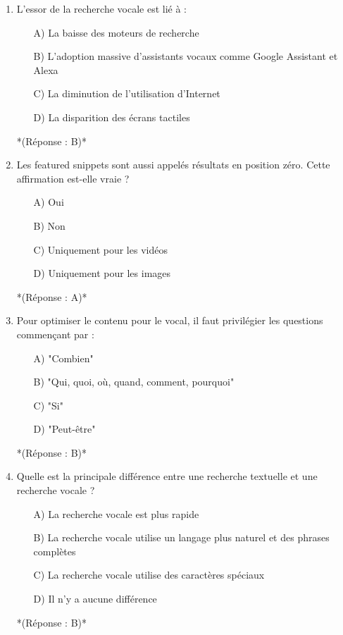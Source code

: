 \documentclass[12pt,a4paper,twoside]{report}
\begin{document}
\begin{enumerate}
    \item L'essor de la recherche vocale est lié à :
    \begin{itemize}
        \item[A)] La baisse des moteurs de recherche
        \item[B)] L'adoption massive d'assistants vocaux comme Google Assistant et Alexa
        \item[C)] La diminution de l'utilisation d'Internet
        \item[D)] La disparition des écrans tactiles
    \end{itemize}
    *(Réponse : B)*

    \item Les featured snippets sont aussi appelés résultats en position zéro. Cette affirmation est-elle vraie ?
    \begin{itemize}
        \item[A)] Oui
        \item[B)] Non
        \item[C)] Uniquement pour les vidéos
        \item[D)] Uniquement pour les images
    \end{itemize}
    *(Réponse : A)*

    \item Pour optimiser le contenu pour le vocal, il faut privilégier les questions commençant par :
    \begin{itemize}
        \item[A)] "Combien"
        \item[B)] "Qui, quoi, où, quand, comment, pourquoi"
        \item[C)] "Si"
        \item[D)] "Peut-être"
    \end{itemize}
    *(Réponse : B)*

    \item Quelle est la principale différence entre une recherche textuelle et une recherche vocale ?
    \begin{itemize}
        \item[A)] La recherche vocale est plus rapide
        \item[B)] La recherche vocale utilise un langage plus naturel et des phrases complètes
        \item[C)] La recherche vocale utilise des caractères spéciaux
        \item[D)] Il n'y a aucune différence
    \end{itemize}
    *(Réponse : B)*


\end{enumerate}
\end{document}
